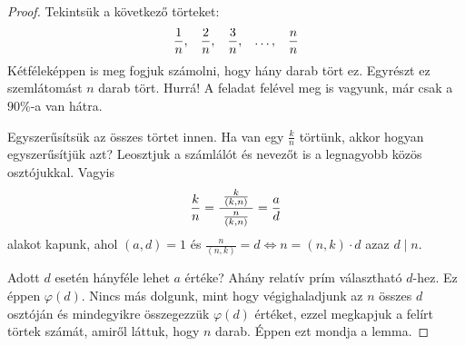 \documentclass[12pt]{book}
\theoremstyle{plain} %
\theoremstyle{definition} %
\theoremstyle{remark}
\numberwithin{equation}{section}  %
\begin{document}
	\begin{proof}
		Tekintsük a következő törteket:
		\[ \dfrac{1}{n}, \hspace{3mm} \dfrac{2}{n}, \hspace{3mm} \dfrac{3}{n}, \hspace{3mm} \ldots, \hspace{3mm} \dfrac{n}{n} \]
		Kétféleképpen is meg fogjuk számolni, hogy hány darab tört ez. Egyrészt ez szemlátomást $n$ darab tört. Hurrá! A feladat felével meg is vagyunk, már csak a $90\%$-a van hátra.
		
		Egyszerűsítsük az összes törtet innen. Ha van egy $\frac{k}{n}$ törtünk, akkor hogyan egyszerűsítjük azt? Leosztjuk a számlálót és nevezőt is a legnagyobb közös osztójukkal. Vagyis 
		\[ \dfrac{k}{n} = \dfrac{\hspace{1mm} \frac{k}{(k,n)} \hspace{1mm}}{\frac{n}{(k,n)}} = \dfrac{a}{d} \]
		alakot kapunk, ahol $(a,d)=1$ és $\frac{n}{(n,k)} = d \Leftrightarrow n = (n,k)\cdot d$ azaz $d\mid n$.
		
		Adott $d$ esetén hányféle lehet $a$ értéke? Ahány relatív prím választható $d$-hez. Ez éppen $\varphi(d)$. Nincs más dolgunk, mint hogy végighaladjunk az $n$ összes $d$ osztóján és mindegyikre összegezzük $\varphi(d)$ értéket, ezzel megkapjuk a felírt törtek számát, amiről láttuk, hogy $n$ darab. Éppen ezt mondja a lemma.
	\end{proof}
\end{document}

